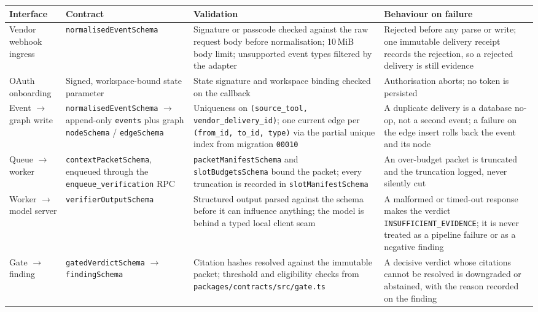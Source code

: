 \begin{longtable}{>{\raggedright\arraybackslash}p{}>{\raggedright\arraybackslash}p{}>{\raggedright\arraybackslash}p{}>{\raggedright\arraybackslash}p{}}
\toprule
\textbf{Interface} & \textbf{Contract} & \textbf{Validation} &
  \textbf{Behaviour on failure} \\
\midrule
\endhead
Vendor webhook ingress
  & \texttt{normalisedEventSchema}
  & Signature or passcode checked against the raw request body before
    normalisation; 10\,MiB body limit; unsupported event types filtered by the
    adapter
  & Rejected before any parse or write; one immutable delivery receipt records
    the rejection, so a rejected delivery is still evidence \\
OAuth onboarding
  & Signed, workspace-bound state parameter
  & State signature and workspace binding checked on the callback
  & Authorisation aborts; no token is persisted \\
Event $\rightarrow$ graph write
  & \texttt{normalisedEventSchema} $\rightarrow$ append-only \texttt{events}
    plus graph \texttt{nodeSchema} / \texttt{edgeSchema}
  & Uniqueness on \texttt{(source\_tool, vendor\_delivery\_id)}; one current
    edge per \texttt{(from\_id, to\_id, type)} via the partial unique index
    from migration \texttt{00010}
  & A duplicate delivery is a database no-op, not a second event; a failure on
    the edge insert rolls back the event and its node \\
Queue $\rightarrow$ worker
  & \texttt{contextPacketSchema}, enqueued through the
    \texttt{enqueue\_verification} RPC
  & \texttt{packetManifestSchema} and \texttt{slotBudgetsSchema} bound the
    packet; every truncation is recorded in \texttt{slotManifestSchema}
  & An over-budget packet is truncated and the truncation logged, never
    silently cut \\
Worker $\rightarrow$ model server
  & \texttt{verifierOutputSchema}
  & Structured output parsed against the schema before it can influence
    anything; the model is behind a typed local client seam
  & A malformed or timed-out response makes the verdict \texttt{INSUFFICIENT\_EVIDENCE};
    it is never treated as a pipeline failure or as a negative finding \\
Gate $\rightarrow$ finding
  & \texttt{gatedVerdictSchema} $\rightarrow$ \texttt{findingSchema}
  & Citation hashes resolved against the immutable packet; threshold and
    eligibility checks from \texttt{packages/contracts/src/gate.ts}
  & A decisive verdict whose citations cannot be resolved is downgraded or
    abstained, with the reason recorded on the finding \\
\bottomrule
\end{longtable}


